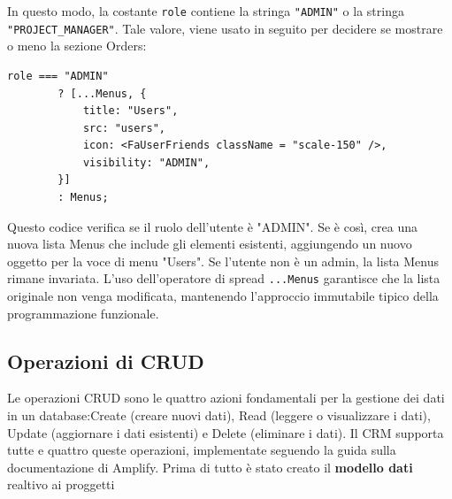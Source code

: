 \documentclass[target=bach,aauheader=,style=]{thud}
\begin{document}
\noindent In questo modo, la costante \texttt{role} contiene la stringa \texttt{"ADMIN"} o la stringa  \texttt{"PROJECT\_MANAGER"}. Tale valore, viene usato in seguito per decidere se mostrare o meno la sezione Orders:

\begin{lstlisting}[caption=Verifica ruolo]
    role === "ADMIN" 
        ? [...Menus, {
            title: "Users",
            src: "users",
            icon: <FaUserFriends className = "scale-150" />,
            visibility: "ADMIN",
        }]
        : Menus;
\end{lstlisting}

\noindent Questo codice verifica se il ruolo dell'utente è "ADMIN". Se è così, crea una nuova lista Menus che include gli elementi esistenti, aggiungendo un nuovo oggetto per la voce di menu "Users". Se l'utente non è un admin, la lista Menus rimane invariata. L'uso dell'operatore di spread \texttt{...Menus} garantisce che la lista originale non venga modificata, mantenendo l'approccio immutabile tipico della programmazione funzionale.

\subsection{Operazioni di CRUD}
Le operazioni CRUD sono le quattro azioni fondamentali per la gestione dei dati in un database:Create (creare nuovi dati), Read (leggere o visualizzare i dati), Update (aggiornare i dati esistenti) e Delete (eliminare i dati). Il CRM supporta tutte e quattro queste operazioni, implementate seguendo la guida \cite{awsamplifynextjs2024} sulla documentazione di Amplify. Prima di tutto è stato creato il \textbf{modello dati} realtivo ai proggetti
\end{document}
